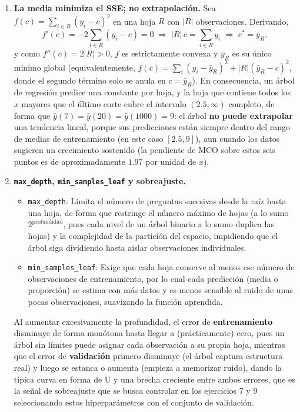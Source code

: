 \begin{enumerate}
\item \textbf{La media minimiza el SSE; no extrapolación.}
Sea $f(c)=\sum_{i\in R}(y_i-c)^2$ en una hoja $R$ con $|R|$
observaciones. Derivando,
\[
    f'(c) = -2\sum_{i\in R}(y_i-c) = 0
    \;\Longrightarrow\; |R|\,c = \sum_{i\in R}y_i
    \;\Longrightarrow\; c^* = \bar y_R ,
\]
y como $f''(c)=2|R|>0$, $f$ es estrictamente convexa y $\bar y_R$ es su
único mínimo global (equivalentemente,
$f(c)=\sum_i(y_i-\bar y_R)^2+|R|(\bar y_R-c)^2$, donde el segundo término
solo se anula en $c=\bar y_R$). En consecuencia, un árbol de regresión
predice una constante por hoja, y la hoja que contiene todos los $x$
mayores que el último corte cubre el intervalo $(2.5,\infty)$ completo,
de forma que $\hat y(7)=\hat y(20)=\hat y(1000)=9$: el árbol \textbf{no
puede extrapolar} una tendencia lineal, porque sus predicciones están
siempre dentro del rango de medias de entrenamiento (en este caso
$[2.5,9]$), aun cuando los datos sugieren un crecimiento sostenido
(la pendiente de MCO sobre estos seis puntos es de aproximadamente $1.97$
por unidad de $x$).

\item \textbf{\texttt{max\_depth}, \texttt{min\_samples\_leaf} y sobreajuste.}
\begin{itemize}
    \item \texttt{max\_depth}: Limita el número de preguntas sucesivas
    desde la raíz hasta una hoja, de forma que restringe el número máximo
    de hojas (a lo sumo $2^{\text{profundidad}}$, pues cada nivel de un
árbol binario a lo sumo duplica las hojas) y la complejidad de la partición
    del espacio, impidiendo que el árbol siga dividiendo hasta aislar
    observaciones individuales.
    \item \texttt{min\_samples\_leaf}: Exige que cada hoja conserve al
    menos ese número de observaciones de entrenamiento, por lo cual
    cada predicción (media o proporción) se estima con más datos y es
    menos sensible al ruido de unas pocas observaciones, suavizando la
    función aprendida.
\end{itemize}
Al aumentar excesivamente la profundidad, el error de
\textbf{entrenamiento} disminuye de forma monótona hasta llegar a
(prácticamente) cero, pues un árbol sin límites puede asignar cada
observación a su propia hoja, mientras que el error de
\textbf{validación} primero disminuye (el árbol captura estructura real)
y luego se estanca o aumenta (empieza a memorizar ruido), dando la
típica curva en forma de U y una brecha creciente entre ambos errores,
que es la señal de sobreajuste que se busca controlar en los ejercicios
7 y 9 seleccionando estos hiperparámetros con el conjunto de
validación.

\end{enumerate}
